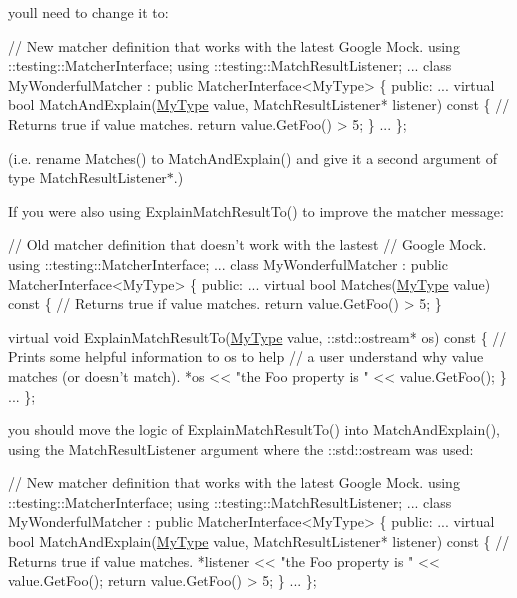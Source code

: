 you\textquotesingle{}ll need to change it to\+: 
\begin{DoxyCode}
\textcolor{comment}{// New matcher definition that works with the latest Google Mock.}
using ::testing::MatcherInterface;
using ::testing::MatchResultListener;
...
class MyWonderfulMatcher : \textcolor{keyword}{public} MatcherInterface<MyType> \{
 \textcolor{keyword}{public}:
  ...
  \textcolor{keyword}{virtual} \textcolor{keywordtype}{bool} MatchAndExplain(\hyperlink{classMyType}{MyType} value,
                               MatchResultListener* listener)\textcolor{keyword}{ const }\{
    \textcolor{comment}{// Returns true if value matches.}
    \textcolor{keywordflow}{return} value.GetFoo() > 5;
  \}
  ...
\};
\end{DoxyCode}
 (i.\+e. rename {\ttfamily Matches()} to {\ttfamily Match\+And\+Explain()} and give it a second argument of type {\ttfamily Match\+Result\+Listener$\ast$}.)

If you were also using {\ttfamily Explain\+Match\+Result\+To()} to improve the matcher message\+: 
\begin{DoxyCode}
\textcolor{comment}{// Old matcher definition that doesn't work with the lastest}
\textcolor{comment}{// Google Mock.}
using ::testing::MatcherInterface;
...
class MyWonderfulMatcher : \textcolor{keyword}{public} MatcherInterface<MyType> \{
 \textcolor{keyword}{public}:
  ...
  \textcolor{keyword}{virtual} \textcolor{keywordtype}{bool} Matches(\hyperlink{classMyType}{MyType} value)\textcolor{keyword}{ const }\{
    \textcolor{comment}{// Returns true if value matches.}
    \textcolor{keywordflow}{return} value.GetFoo() > 5;
  \}

  \textcolor{keyword}{virtual} \textcolor{keywordtype}{void} ExplainMatchResultTo(\hyperlink{classMyType}{MyType} value,
                                    ::std::ostream* os)\textcolor{keyword}{ const }\{
    \textcolor{comment}{// Prints some helpful information to os to help}
    \textcolor{comment}{// a user understand why value matches (or doesn't match).}
    *os << \textcolor{stringliteral}{"the Foo property is "} << value.GetFoo();
  \}
  ...
\};
\end{DoxyCode}


you should move the logic of {\ttfamily Explain\+Match\+Result\+To()} into {\ttfamily Match\+And\+Explain()}, using the {\ttfamily Match\+Result\+Listener} argument where the {\ttfamily \+::std\+::ostream} was used\+: 
\begin{DoxyCode}
\textcolor{comment}{// New matcher definition that works with the latest Google Mock.}
using ::testing::MatcherInterface;
using ::testing::MatchResultListener;
...
class MyWonderfulMatcher : \textcolor{keyword}{public} MatcherInterface<MyType> \{
 \textcolor{keyword}{public}:
  ...
  \textcolor{keyword}{virtual} \textcolor{keywordtype}{bool} MatchAndExplain(\hyperlink{classMyType}{MyType} value,
                               MatchResultListener* listener)\textcolor{keyword}{ const }\{
    \textcolor{comment}{// Returns true if value matches.}
    *listener << \textcolor{stringliteral}{"the Foo property is "} << value.GetFoo();
    \textcolor{keywordflow}{return} value.GetFoo() > 5;
  \}
  ...
\};
\end{DoxyCode}


